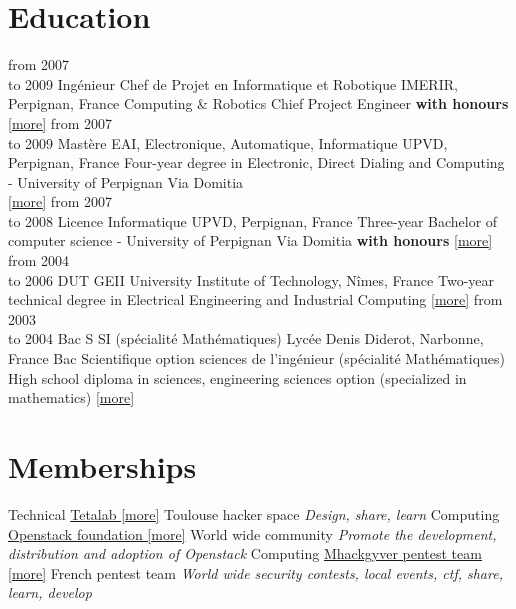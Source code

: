\documentclass[]{friggeri-cv}
\begin{document}
\section{Education}
\begin{entrylist}
    \entry
        {from 2007\\to 2009}
        {Ingénieur Chef de Projet en Informatique et Robotique}
        {IMERIR, Perpignan, France}
	{Computing \& Robotics Chief Project Engineer
	\textbf{with honours}\\
        \href{https://www.imerir.com/}{[\underline{more}]}
	}
    \entry
        {from 2007\\to 2009}
        {Mastère EAI, Electronique, Automatique, Informatique}
        {UPVD, Perpignan, France}
	{Four-year degree in Electronic, Direct Dialing and Computing - University of Perpignan Via Domitia\\
        \href{https://www.univ-perp.fr/master-electronique-automatique-informatique-28229.kjsp}{[\underline{more}]}
	}
    \entry
        {from 2007\\to 2008}
        {Licence Informatique}
        {UPVD, Perpignan, France}
	{Three-year Bachelor of computer science - University of Perpignan Via Domitia
	\textbf{with honours}
        \href{https://www.univ-perp.fr/licence-informatique-4727.kjsp}{[\underline{more}]}
	}
    \entry
        {from 2004 \\to 2006}
        {DUT GEII}
        {University Institute of Technology, Nîmes, France}
	{Two-year technical degree in Electrical Engineering and Industrial Computing 
        \href{http://www.iut-nimes.fr/dut/geii}{[\underline{more}]}
	}
    \entry
        {from 2003\\to 2004}
        {Bac S SI (spécialité Mathématiques)}
        {Lycée Denis Diderot, Narbonne, France}
	{Bac Scientifique option sciences de l'ingénieur (spécialité Mathématiques) \\
	High school diploma in sciences, engineering sciences option (specialized in mathematics)
        \href{https://www.lyc-michel-narbonne.ac-montpellier.fr/content/bac-s}{[\underline{more}]}
	}
\end{entrylist}

\newpage
\section{Memberships}
\begin{entrylist}
    \entry
        {Technical}
        {\href{https://www.tetalab.org/en}{Tetalab [\underline{more}]}}
        {Toulouse hacker space}
        {\emph{Design, share, learn}}
    \entry
        {Computing}
        {\href{https://www.openstack.org/foundation/}{Openstack foundation [\underline{more}]}}
        {World wide community}
        {\emph{Promote the development, distribution and adoption of Openstack}}
    \entry
        {Computing}
        {\href{https://github.com/mhackgyver-squad/mhackgyver}{Mhackgyver pentest team [\underline{more}]}}
        {French pentest team}
        {\emph{World wide security contests, local events, ctf, share, learn, develop}}
\end{entrylist}
\end{document}
